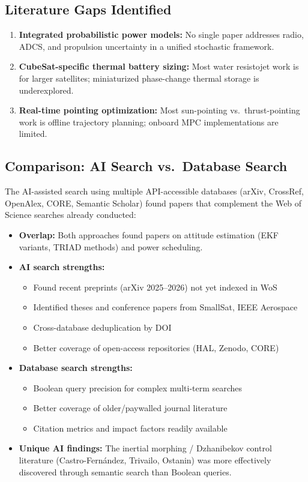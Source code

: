 \documentclass[11pt]{article}
\begin{document}
\subsection{Literature Gaps Identified}

\begin{enumerate}
    \item \textbf{Integrated probabilistic power models:} No single paper addresses radio, ADCS, and propulsion uncertainty in a unified stochastic framework.
    \item \textbf{CubeSat-specific thermal battery sizing:} Most water resistojet work is for larger satellites; miniaturized phase-change thermal storage is underexplored.
    \item \textbf{Real-time pointing optimization:} Most sun-pointing vs.\ thrust-pointing work is offline trajectory planning; onboard MPC implementations are limited.
\end{enumerate}

\subsection{Comparison: AI Search vs.\ Database Search}

The AI-assisted search using multiple API-accessible databases (arXiv, CrossRef, OpenAlex, CORE, Semantic Scholar) found papers that complement the Web of Science searches already conducted:

\begin{itemize}
    \item \textbf{Overlap:} Both approaches found papers on attitude estimation (EKF variants, TRIAD methods) and power scheduling.
    \item \textbf{AI search strengths:}
    \begin{itemize}
        \item Found recent preprints (arXiv 2025--2026) not yet indexed in WoS
        \item Identified theses and conference papers from SmallSat, IEEE Aerospace
        \item Cross-database deduplication by DOI
        \item Better coverage of open-access repositories (HAL, Zenodo, CORE)
    \end{itemize}
    \item \textbf{Database search strengths:}
    \begin{itemize}
        \item Boolean query precision for complex multi-term searches
        \item Better coverage of older/paywalled journal literature
        \item Citation metrics and impact factors readily available
    \end{itemize}
    \item \textbf{Unique AI findings:} The inertial morphing / Dzhanibekov control literature (Castro-Fern\'{a}ndez, Trivailo, Ostanin) was more effectively discovered through semantic search than Boolean queries.
\end{itemize}
\end{document}
